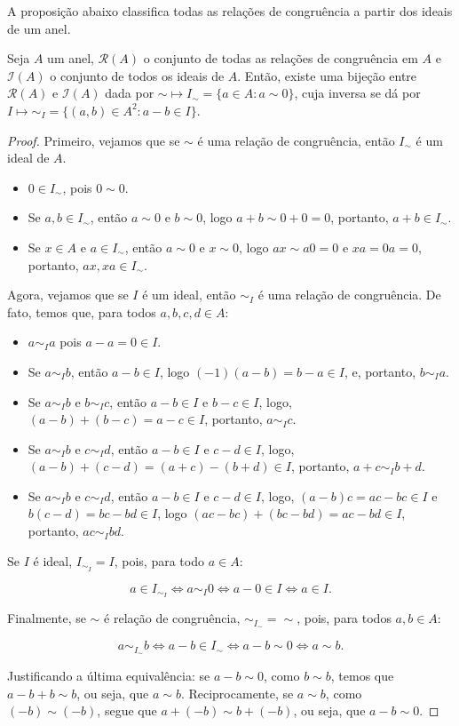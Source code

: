 A proposição abaixo classifica todas as relações de congruência a partir dos ideais de um anel.
\begin{prop}
    Seja $A$ um anel, $\mathcal R(A)$ o conjunto de todas as relações de congruência em $A$ e $\mathcal I(A)$ o conjunto de todos os ideais de $A$.
    Então, existe uma bijeção entre $\mathcal R(A)$ e $\mathcal I(A)$ dada por
    $\sim \mapsto I_{\sim}=\{a \in A: a\sim 0\}$,
    cuja inversa se dá por $I\mapsto \sim_I=\{(a, b) \in A^2: a-b \in I\}$.
\end{prop}
\begin{proof}
Primeiro, vejamos que se $\sim$ é uma relação de congruência, então $I_\sim$ é um ideal de $A$.

\begin{itemize}
\item $0 \in I_\sim$, pois $0\sim 0$.
\item Se $a, b \in I_\sim$, então $a\sim 0$ e $b\sim 0$, logo $a+b\sim 0+0=0$, portanto, $a+b \in I_\sim$.
\item Se $x \in A$ e $a \in I_\sim$, então $a\sim 0$ e $x\sim 0$, logo $ax\sim a0=0$ e $xa=0a=0$, portanto, $ax, xa \in I_\sim$.
\end{itemize}

Agora, vejamos que se $I$ é um ideal, então $\sim_I$ é uma relação de congruência. De fato, temos que, para todos $a, b, c, d \in A$:
\begin{itemize}
    \item $a\sim_I a$ pois $a-a=0\in I$.
    \item Se $a\sim_I b$, então $a-b \in I$, logo $(-1)(a-b)=b-a\in I$, e, portanto, $b\sim_I a$.
    \item Se $a\sim_I b$ e $b\sim_I c$, então $a-b \in I$ e $b-c \in I$, logo, $(a-b)+(b-c)=a-c \in I$, portanto, $a\sim_I c$.
    \item Se $a\sim_I b$ e $c\sim_I d$, então $a-b \in I$ e $c-d \in I$, logo, $(a-b)+(c-d)=(a+c)-(b+d)\in I$, portanto, $a+c\sim_I b+d$.
    \item Se $a\sim_I b$ e $c\sim_I d$, então $a-b \in I$ e $c-d \in I$, logo, $(a-b)c=ac-bc\in I$ e $b(c-d)=bc-bd\in I$, logo $(ac-bc)+(bc-bd)=ac-bd\in I$, portanto, $ac\sim_I bd$.
    \end{itemize}

Se $I$ é ideal, $I_{\sim_I}=I$, pois, para todo $a\in A$:

$$a\in I_{\sim_I}\Leftrightarrow a\sim_I 0\Leftrightarrow a-0\in I\Leftrightarrow a\in I.$$

Finalmente, se $\sim$ é relação de congruência, $\sim_{I_\sim}=\sim$, pois, para todos $a, b \in A$:

$$a\sim_{I_\sim} b\Leftrightarrow a-b\in I_\sim \Leftrightarrow a-b\sim 0\Leftrightarrow a\sim b.$$

Justificando a última equivalência: se $a-b\sim 0$, como $b\sim b$, temos que $a-b+b\sim b$, ou seja, que $a\sim b$. Reciprocamente, se $a\sim b$, como $(-b)\sim (-b)$, segue que $a+(-b)\sim b+(-b)$, ou seja, que $a-b\sim 0$.
\end{proof}

